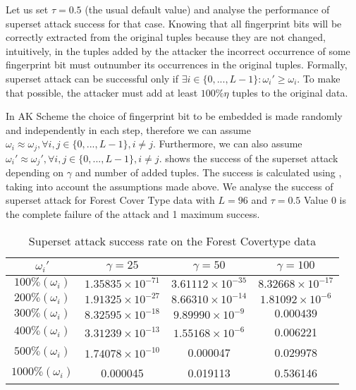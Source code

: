 Let us set $\tau=0.5$ (the usual default value) and analyse the performance of superset attack success for that case.
Knowing that all fingerprint bits will be correctly extracted from the original tuples because they are not changed, intuitively, in the tuples added by the attacker the incorrect occurrence of some fingerprint bit must outnumber its occurrences in the original tuples.
Formally, superset attack can be successful only if $\exists i\in\{0,...,L-1\}: \omega_i'\geq\omega_i$.
To make that possible, the attacker must add at least $100\%\eta$ tuples to the original data.

In AK Scheme the choice of fingerprint bit to be embedded is made randomly and independently in each step, therefore we can assume $\omega_i\approx\omega_j, \forall i,j \in \{0,...,L-1\}, i \neq j$. 
Furthermore, we can also assume $\omega_i'\approx\omega_j', \forall i,j \in \{0,...,L-1\}, i \neq j$.
 shows the success of the superset attack depending on $\gamma$ and number of added tuples. 
The success is calculated using , taking into account the assumptions made above. 
We analyse the success of superset attack for Forest Cover Type data with $L=96$ and $\tau=0.5$
Value 0 is the complete failure of the attack and 1 maximum success. 

\begin{table}[ht]
    \centering
    \caption{Superset attack success rate on the Forest Covertype data}
    \label{tab:superset-attack-forest}
    \begin{tabular}{|c||c|c|c|}
    \hline
         $\omega_i'$ & $\gamma=25$ & $\gamma=50$ & $\gamma=100$ \\
        \hline
         $100\%(\omega_i)$ & $1.35835\times10^{-71}$ & $3.61112\times10^{-35}$ & $8.32668\times10^{-17}$ \\
         \hline
         $200\%(\omega_i)$ & $1.91325\times10^{-27}$ & $8.66310\times10^{-14}$ & $1.81092\times10^{-6}$ \\
         \hline
         $300\%(\omega_i)$ & $8.32595\times10^{-18}$ & $9.89990\times10^{-9}$ & $0.000439$ \\
         \hline
         $400\%(\omega_i)$ & $3.31239\times10^{-13}$ & $1.55168\times10^{-6}$ & 0.006221 \\
         \hline
         $500\%(\omega_i)$ & $1.74078\times10^{-10}$ & 0.000047 & 0.029978 \\
         \hline
         $1000\%(\omega_i)$ & 0.000045 & 0.019113 & 0.536146 \\
         \hline
    \end{tabular}
\end{table}

